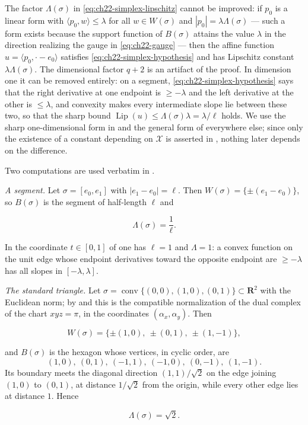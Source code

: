\begin{remark}
\label{rem:ch22-simplex-constant}
The factor \(\Lambda(\sigma)\) in
\eqref{eq:ch22-simplex-lipschitz} cannot be improved: if \(p_0\) is a linear
form with \(\langle p_0,w\rangle\leq\lambda\) for all \(w\in W(\sigma)\) and
\(|p_0|=\lambda\Lambda(\sigma)\) --- such a form exists because the support
function of \(B(\sigma)\) attains the value \(\lambda\) in the direction
realizing the gauge in \eqref{eq:ch22-gauge} --- then the affine function
\(u=\langle p_0,\cdot-e_0\rangle\) satisfies
\eqref{eq:ch22-simplex-hypothesis} and has Lipschitz constant
\(\lambda\Lambda(\sigma)\).  The dimensional factor \(q+2\) is an artifact
of the proof.  In dimension one it can be removed entirely: on a segment,
\eqref{eq:ch22-simplex-hypothesis} says that the right derivative at one
endpoint is \(\geq-\lambda\) and the left derivative at the other is
\(\leq\lambda\), and convexity makes every intermediate slope lie between
these two, so that the sharp bound
\(\operatorname{Lip}(u)\leq\Lambda(\sigma)\lambda=\lambda/\ell\) holds.  We
use the sharp one-dimensional form in
 and the general form of
 everywhere else; since only the existence of a
constant depending on \(\mathcal X\) is asserted in
, nothing later depends on the
difference.
\end{remark}

\begin{example}
\label{ex:ch22-gauge-computed}
Two computations are used verbatim in
.

\emph{A segment.}  Let \(\sigma=[e_0,e_1]\) with
\(|e_1-e_0|=\ell\).  Then \(W(\sigma)=\{\pm(e_1-e_0)\}\), so
\(B(\sigma)\) is the segment of half-length \(\ell\) and

\[
 \Lambda(\sigma)=\frac1\ell .
\tag{22.18}\label{eq:ch22-gauge-segment}
\]

In the coordinate \(t\in[0,1]\) of  one has
\(\ell=1\) and \(\Lambda=1\): a convex function on the unit edge whose
endpoint derivatives toward the opposite endpoint are \(\geq-\lambda\) has
all slopes in \([-\lambda,\lambda]\).

\emph{The standard triangle.}  Let
\(\sigma=\operatorname{conv}\{(0,0),(1,0),(0,1)\}\subset\mathbf R^2\) with
the Euclidean norm; by  and
 this is the compatible normalization of the
dual complex of the chart \(xyz=\pi\), in the coordinates
\((\alpha_x,\alpha_y)\).  Then

\[
 W(\sigma)=\{\pm(1,0),\ \pm(0,1),\ \pm(1,-1)\},
\]

and \(B(\sigma)\) is the hexagon whose vertices, in cyclic order, are
\[
 (1,0),\ (0,1),\ (-1,1),\ (-1,0),\ (0,-1),\ (1,-1).
\]
Its boundary meets the
diagonal direction \((1,1)/\sqrt2\) on the edge joining \((1,0)\) to
\((0,1)\), at distance \(1/\sqrt2\) from the origin, while every other edge
lies at distance \(1\).  Hence

\[
 \Lambda(\sigma)=\sqrt2 .
\tag{22.19}\label{eq:ch22-gauge-triangle}
\]
\end{example}

